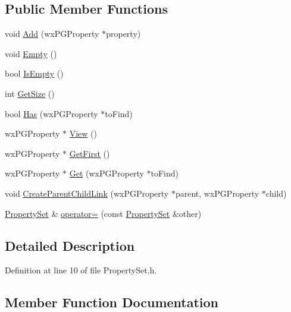 \subsection*{Public Member Functions}
\begin{DoxyCompactItemize}
\item 
void \hyperlink{class_property_set_ae3ee2ada7aa02653e9f4da3e34640a1e}{Add} (wx\+P\+G\+Property $\ast$property)
\item 
void \hyperlink{class_property_set_a158da716546ca640cd81ffb555bcfddc}{Empty} ()
\item 
bool \hyperlink{class_property_set_a74caf43bdcc3717836a3130d6c3dad18}{Is\+Empty} ()
\item 
int \hyperlink{class_property_set_abbc61ecb91ccb481ea4597e7d4c4be9b}{Get\+Size} ()
\item 
bool \hyperlink{class_property_set_affec0e3a12cfab591a5ea8821244aa60}{Has} (wx\+P\+G\+Property $\ast$to\+Find)
\item 
wx\+P\+G\+Property $\ast$ \hyperlink{class_property_set_a3838d3ec98d411f46cd22633b48ca091}{View} ()
\item 
wx\+P\+G\+Property $\ast$ \hyperlink{class_property_set_aece224749884f449d1afda598d468b41}{Get\+First} ()
\item 
wx\+P\+G\+Property $\ast$ \hyperlink{class_property_set_abfdeede5db336610ec5936a57ec3c2fe}{Get} (wx\+P\+G\+Property $\ast$to\+Find)
\item 
void \hyperlink{class_property_set_a26e9efb314e2ed720719e13c459f137b}{Create\+Parent\+Child\+Link} (wx\+P\+G\+Property $\ast$parent, wx\+P\+G\+Property $\ast$child)
\item 
\hyperlink{class_property_set}{Property\+Set} \& \hyperlink{class_property_set_a388cd14ca61a4656e740b14831507108}{operator=} (const \hyperlink{class_property_set}{Property\+Set} \&other)
\end{DoxyCompactItemize}


\subsection{Detailed Description}


Definition at line 10 of file Property\+Set.\+h.



\subsection{Member Function Documentation}
\mbox{\label{class_property_set_ae3ee2ada7aa02653e9f4da3e34640a1e}} 
